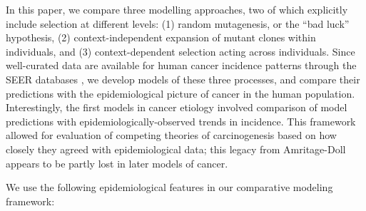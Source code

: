 \documentclass[10pt,twocolumn,twoside]{article}
\begin{document}
In this paper, we compare three modelling approaches, two of which explicitly include selection at different levels: (1) random mutagenesis, or the ``bad luck'' hypothesis, (2) context-independent expansion of mutant clones within individuals, and (3) context-dependent selection acting across individuals. Since well-curated data are available for human cancer incidence patterns through the SEER databases \cite{AmericanCancerSociety2016}, we develop models of these three processes, and compare their predictions with the epidemiological picture of cancer in the human population. Interestingly, the first models in cancer etiology involved comparison of model predictions with epidemiologically-observed trends in incidence. This framework allowed for evaluation of competing theories of carcinogenesis based on how closely they agreed with epidemiological data; this legacy from Amritage-Doll appears to be partly lost in later models of cancer.

We use the following epidemiological features in our comparative modeling framework:
\end{document}
